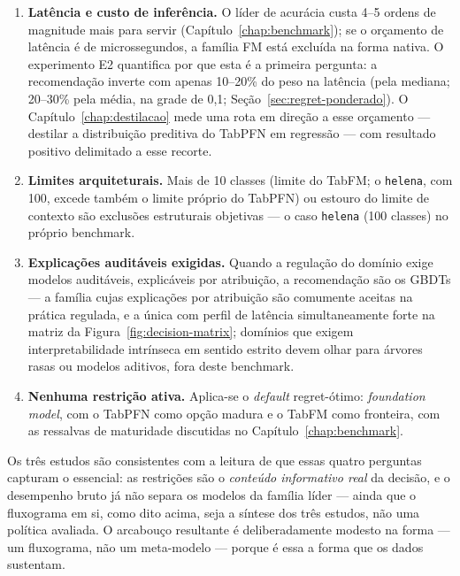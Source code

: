 \begin{enumerate}
  \item \textbf{Latência e custo de inferência.} O líder de acurácia
    custa 4--5 ordens de magnitude mais para servir
    (Capítulo~\ref{chap:benchmark}); se o orçamento de latência é de
    microssegundos, a família FM está excluída na forma nativa. O
    experimento E2 quantifica por que esta é a primeira pergunta: a
    recomendação inverte com apenas 10--20\% do peso na latência
    (pela mediana; 20--30\% pela média, na grade de 0,1;
    Seção~\ref{sec:regret-ponderado}). O
    Capítulo~\ref{chap:destilacao} mede uma rota em direção a esse
    orçamento --- destilar a distribuição preditiva do TabPFN em
    regressão --- com resultado positivo delimitado a esse recorte.
  \item \textbf{Limites arquiteturais.} Mais de 10 classes (limite
    do TabFM; o \texttt{helena}, com 100, excede também o limite
    próprio do TabPFN) ou estouro do limite de contexto são
    exclusões estruturais
    objetivas --- o caso \texttt{helena} (100 classes) no próprio
    benchmark.
  \item \textbf{Explicações auditáveis exigidas.} Quando a
    regulação do domínio exige modelos auditáveis, explicáveis por
    atribuição,
    a recomendação são os GBDTs --- a família cujas explicações por
    atribuição são comumente aceitas na prática regulada, e a única
    com perfil de latência simultaneamente forte na matriz da
    Figura~\ref{fig:decision-matrix}; domínios que exigem
    interpretabilidade intrínseca em sentido estrito devem olhar para
    árvores rasas ou modelos aditivos, fora deste benchmark.
  \item \textbf{Nenhuma restrição ativa.} Aplica-se o \emph{default}
    regret-ótimo: \emph{foundation model}, com o TabPFN \citep{hollmann2025}
    como opção madura e o TabFM \citep{tabfm2026} como fronteira, com
    as ressalvas de maturidade discutidas no
    Capítulo~\ref{chap:benchmark}.
\end{enumerate}

Os três estudos são consistentes com a leitura de que essas quatro
perguntas capturam o
essencial: as restrições são o \emph{conteúdo informativo real} da
decisão, e o desempenho bruto já não separa os modelos da família
líder --- ainda que o fluxograma em si, como dito acima, seja a
síntese dos três estudos, não uma política avaliada. O arcabouço
resultante é deliberadamente modesto na forma --- um
fluxograma, não um meta-modelo --- porque é essa a forma que os dados
sustentam.

